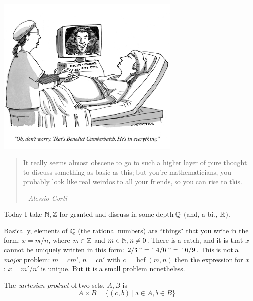 \documentclass[10pt]{scrartcl}
\DeclareMathOperator{\hcf}{hcf}
\begin{document}
\vspace*{2cm}
\begin{center}
\includegraphics[width=9cm]{cartoon1.png}
\end{center}





\begin{quote}
It really seems almost obscene to go to such a higher layer of pure thought to discuss something as basic as this; but you're mathematicians, you probably look like real weirdos to all your friends, so you can rise to this.  
\begin{flushright}
      \textit{ -  Alessio Corti}
       \end{flushright} 
\end{quote}\vspace*{15pt}


Today  I take $\mathbb{N}, \mathbb{Z}$ for granted and discuss in some depth $\mathbb{Q}$ (and, a bit, $\mathbb{R}$). 


Basically, elements of $\mathbb{Q}$ (the rational numbers) are ``things" that you write in the form: $x = m/n$, where $m \in \mathbb{Z}$ and $m \in\mathbb{N}, n \neq 0$. There is a catch, and it is that $x$ cannot be uniquely written in this form: 
$2/3\; ``=" \;4/6\; ``=" \;6/9$. This is not a \emph{major} problem: $m = cm'$, $n = cn'$ with $c = \hcf(m,n)$ then the expression for $x$: $x = m'/n'$ is unique. But it is a small problem nonetheless.\\

\begin{definition}
The \emph{cartesian product} of two sets, $A,B$ is 
\[A \times B = \{(a,b) ~|~ a \in A, b \in B\}\]	
\end{definition}
\end{document}

